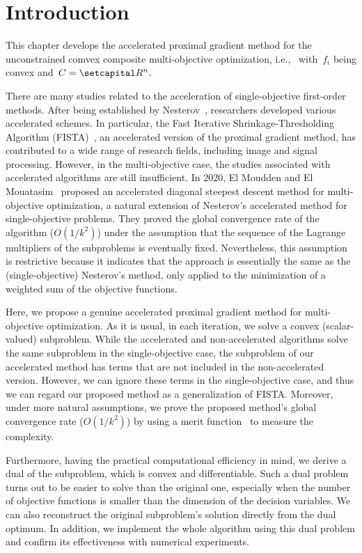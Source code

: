\documentclass[../main]{subfiles}
\begin{document}
\section{Introduction}
This chapter develops the accelerated proximal gradient method for the unconstrained comvex composite multi-objective optimization, i.e.,~ with~$f_i$ being convex and~$C = \setR^n$.

There are many studies related to the acceleration of single-objective first-order methods.
After being established by Nesterov~\cite{Nesterov1983}, researchers developed various accelerated schemes.
In particular, the Fast Iterative Shrinkage-Thresholding Algorithm (FISTA)~\cite{Beck2009}, an accelerated version of the proximal gradient method, has contributed to a wide range of research fields, including image and signal processing.
However, in the multi-objective case, the studies associated with accelerated algorithms are still insufficient.
In 2020, El Moudden and El Mouatasim~\cite{ElMoudden2020} proposed an accelerated diagonal steepest descent method for multi-objective optimization, a natural extension of Nesterov's accelerated method for single-objective problems.
They proved the global convergence rate of the algorithm ($O(1 / k^2)$) under the assumption that the sequence of the Lagrange multipliers of the subproblems is eventually fixed.
Nevertheless, this assumption is restrictive because it indicates that the approach is essentially the same as the (single-objective) Nesterov's method, only applied to the minimization of a weighted sum of the objective functions.

Here, we propose a genuine accelerated proximal gradient method for multi-objective optimization.
As it is usual, in each iteration, we solve a convex (scalar-valued) subproblem.
While the accelerated and non-accelerated algorithms solve the same subproblem in the single-objective case, the subproblem of our accelerated method has terms that are not included in the non-accelerated version.
However, we can ignore these terms in the single-objective case, and thus we can regard our proposed method as a generalization of FISTA.
Moreover, under more natural assumptions, we prove the proposed method's global convergence rate ($O(1/k^2)$) by using a merit function~ to measure the complexity.

Furthermore, having the practical computational efficiency in mind, we derive a dual of the subproblem, which is convex and differentiable.
Such a dual problem turns out to be easier to solve than the original one, especially when the number of objective functions is smaller than the dimension of the decision variables.
We can also reconstruct the original subproblem's solution directly from the dual optimum.
In addition, we implement the whole algorithm using this dual problem and confirm its effectiveness with numerical experiments.
\end{document}
